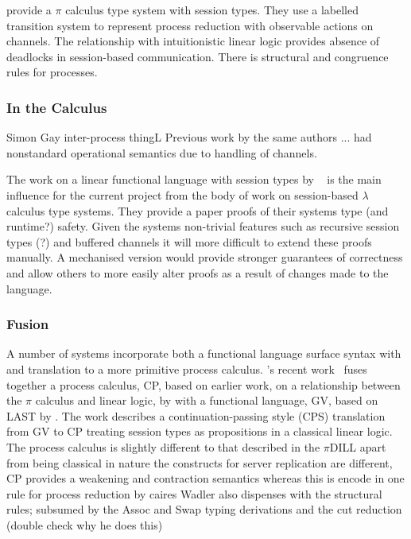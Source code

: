 \documentclass{mprop}
\begin{document}
\citeauthor{Caires:2010:STI} \cite{Caires:2010:STI} provide a $\pi$ calculus type system with session types.
They use a labelled transition system to represent process reduction with observable actions on channels.
The relationship with intuitionistic linear logic provides absence of deadlocks in session-based communication.
There is structural and congruence rules for processes.

\subsubsection{In the \lambda Calculus}\label{sec:lam}

Simon Gay inter-process thingL
Previous work by the same authors ... had nonstandard operational semantics due to handling of channels.

The work on a linear functional language with session types by \citeauthor{Gay:2010:LAST}~\cite{Gay:2010:LAST} is the main influence for the current project from the body of work on session-based $\lambda$ calculus type systems. They provide a paper proofs of their systems type (and runtime?) safety. 
Given the systems non-trivial features such as recursive session types (?) and buffered channels it will more difficult to extend these proofs manually. A mechanised version would provide stronger guarantees of correctness and allow others to more easily alter proofs as a result of changes made to the language.

\subsubsection{Fusion}

A number of systems incorporate both a functional language surface syntax with and translation to a more primitive process calculus. \citeauthor{Wadler:2012}'s recent work~\cite{Wadler:2012} fuses together a process calculus, CP, based on earlier work, on a relationship between the $\pi$ calculus and linear logic, by \citeauthor{Caires:2010:STI} with a functional language, GV, based on LAST by \citeauthor{Gay:2010:LAST}. The work describes a continuation-passing style (CPS) translation from GV to CP treating session types as propositions in a classical linear logic.
The process calculus is slightly different to that described in the $\pi$DILL apart from being classical in nature the constructs for server replication are different, CP provides a weakening and contraction semantics whereas this is encode in one rule for process reduction by caires
Wadler also dispenses with the structural rules; subsumed by the Assoc and Swap typing derivations and the cut reduction (double check why he does this)
\end{document}
